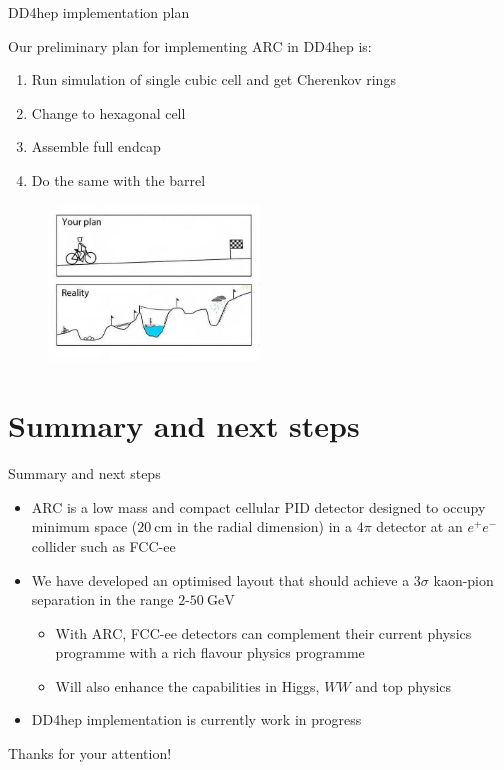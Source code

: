 \documentclass{beamer}
\begin{document}
\begin{frame}{DD4hep implementation plan}
  \begin{center}
    \large Our preliminary plan for implementing ARC in DD4hep is:
  \end{center}
  \vspace{0.3cm}
  \begin{enumerate}
    \setlength\itemsep{0.5em}
    \item{Run simulation of single cubic cell and get Cherenkov rings}
    \item{Change to hexagonal cell}
    \item{Assemble full endcap}
    \item{Do the same with the barrel}
  \end{enumerate}
  \begin{figure}
    \centering
    \includegraphics[width = 0.5\textwidth]{Plots/Plan-vs-Reality.jpeg}
  \end{figure}
\end{frame}

\section{Summary and next steps}
\begin{frame}{Summary and next steps}
  \begin{itemize}
    \setlength\itemsep{1.0em}
    \item{ARC is a low mass and compact cellular PID detector designed to occupy minimum space ($\SI{20}{\centi\meter}$ in the radial dimension) in a $4\pi$ detector at an $e^+e^-$ collider such as FCC-ee}
    \item{We have developed an optimised layout that should achieve a $3\sigma$ kaon-pion separation in the range $2$-$\SI{50}{\giga\eV}$}
    \begin{itemize}
      \setlength\itemsep{0.5em}
      \item{With ARC, FCC-ee detectors can complement their current physics programme with a rich flavour physics programme}
      \item{Will also enhance the capabilities in Higgs, $WW$ and top physics}
    \end{itemize}
    \item{DD4hep implementation is currently work in progress}
  \end{itemize}
  \begin{center}
    \huge Thanks for your attention!
  \end{center}
\end{frame}
\end{document}
